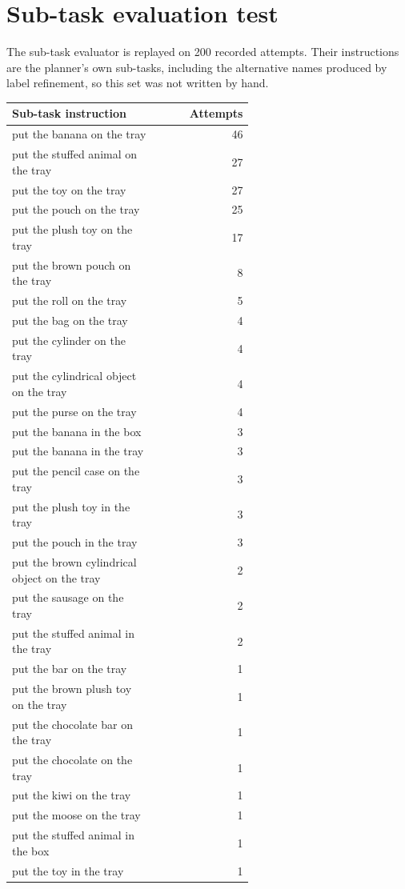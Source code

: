 \section{Sub-task evaluation test}
\label{app:instr-subtask}
The sub-task evaluator is replayed on 200 recorded attempts. Their instructions
are the planner's own sub-tasks, including the alternative names produced by label
refinement, so this set was not written by hand.
{\small
\begin{longtable}{p{0.6\linewidth} r}
\toprule
Sub-task instruction & Attempts \\
\midrule
\endhead
put the banana on the tray & 46 \\
put the stuffed animal on the tray & 27 \\
put the toy on the tray & 27 \\
put the pouch on the tray & 25 \\
put the plush toy on the tray & 17 \\
put the brown pouch on the tray & 8 \\
put the roll on the tray & 5 \\
put the bag on the tray & 4 \\
put the cylinder on the tray & 4 \\
put the cylindrical object on the tray & 4 \\
put the purse on the tray & 4 \\
put the banana in the box & 3 \\
put the banana in the tray & 3 \\
put the pencil case on the tray & 3 \\
put the plush toy in the tray & 3 \\
put the pouch in the tray & 3 \\
put the brown cylindrical object on the tray & 2 \\
put the sausage on the tray & 2 \\
put the stuffed animal in the tray & 2 \\
put the bar on the tray & 1 \\
put the brown plush toy on the tray & 1 \\
put the chocolate bar on the tray & 1 \\
put the chocolate on the tray & 1 \\
put the kiwi on the tray & 1 \\
put the moose on the tray & 1 \\
put the stuffed animal in the box & 1 \\
put the toy in the tray & 1 \\
\bottomrule
\end{longtable}}

